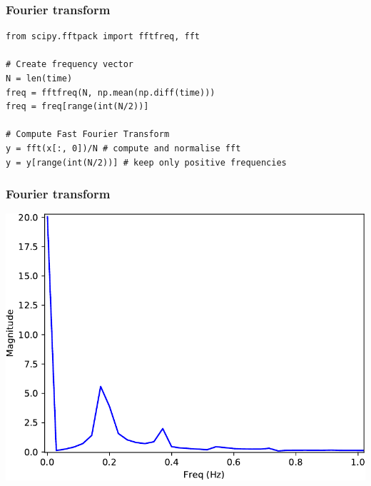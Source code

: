 \documentclass[xcolor=table]{beamer}
\begin{document}
\begin{frame}[fragile]
\frametitle{Fourier transform}

\begin{lstlisting}[style=python]
from scipy.fftpack import fftfreq, fft

# Create frequency vector
N = len(time)
freq = fftfreq(N, np.mean(np.diff(time)))
freq = freq[range(int(N/2))]

# Compute Fast Fourier Transform
y = fft(x[:, 0])/N # compute and normalise fft
y = y[range(int(N/2))] # keep only positive frequencies
\end{lstlisting}

\end{frame}

\begin{frame}[fragile]
\frametitle{Fourier transform}

\begin{center}
	\includegraphics[width=.8\textwidth]{fourier.pdf}
\end{center}

\end{frame}

\end{document}
